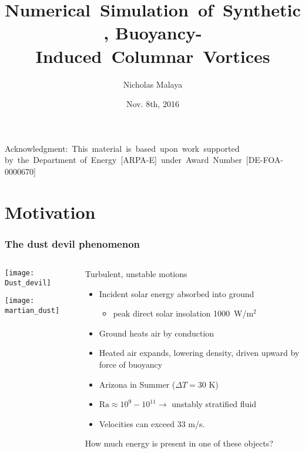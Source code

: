 \documentclass[mathserif]{beamer}
\date{Nov. 8th, 2016}
\author[Nicholas Malaya]{Nicholas Malaya}
\institute{Department of Mechanical Engineering \\ The University of
Texas at Austin}
\title[Dissertation Defense]{%
    \mbox{Numerical Simulation of Synthetic,}
    \mbox{Buoyancy-Induced Columnar Vortices}
}
\newcommand{\rarrow}{\rightarrow}
\begin{document}

\begin{frame}
%
\titlepage{}


\mbox{{\scriptsize Acknowledgment: This material is based upon work
 supported}}
\mbox{{\scriptsize by the Department of Energy [ARPA-E] under Award
 Number [DE-FOA-0000670]}} 
%
\end{frame}


 \section{Motivation}

\begin{frame}
  \frametitle{The dust devil phenomenon}
  \begin{columns}[]
    \begin{column}{0.45\linewidth}
      \begin{center}
        \texttt{[image: Dust\_devil]}
      \end{center}
      \begin{center}
        \texttt{[image: martian\_dust]}
      \end{center}
    \end{column}
    \begin{column}{0.55\linewidth}

      \begin{block}{Turbulent, unstable motions}
        \begin{itemize}
	 \item Incident solar energy absorbed into ground
	       \begin{itemize}
		\item peak direct solar insolation 1000~W/$\text{m}^2$ 
	       \end{itemize}
	 \item Ground heats air by conduction
	 \item Heated air expands, lowering density, 
	       driven upward by force of buoyancy
	 \item Arizona in Summer ($\Delta T= 30$ K) 
	 \item $\text{Ra} \approx 10^9 - 10^{11} \rarrow$ 
	       unstably stratified fluid
	 \item Velocities can exceed 33 m/s.
        \end{itemize}
      \end{block}
      How much energy is present in one of these objects? 
      \end{column}
    \end{columns}
  \end{frame}
\end{document}
